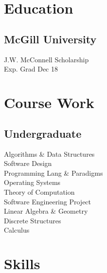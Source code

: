 \documentclass[]{allanwang-resume}
\begin{document}
\header

\begin{minipage}[t][][b]{0.33\textwidth}~

	~\\


	\section{Education}
	\subsection{McGill University}
	J.W. McConnell Scholarship \\
	Exp. Grad Dec 18
	\sectionsep

	\section{Course Work}
	\subsection{Undergraduate}
	Algorithms \& Data Structures \\
	Software Design \\
	Programming Lang \& Paradigms \\
	Operating Systems \\
	Theory of Computation \\
	Software Engineering Project \\
	Linear Algebra \& Geometry \\
	Discrete Structures \\
	Calculus \\
	\sectionsep

	\section{Skills}

\end{minipage}
\end{document}
